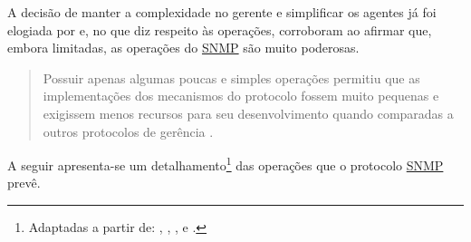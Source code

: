 \documentclass[twoside,english,brazilian]{UNISINOSmonografia}
\begin{document}
A decisão de manter a complexidade no gerente e simplificar os agentes já foi 
elogiada por  e, no que diz respeito às operações, 
 corroboram ao afirmar que, embora 
limitadas, as operações do \hyperref[siglas]{SNMP} são muito poderosas.

\begin{quote}
Possuir apenas algumas poucas e simples operações permitiu que as 
implementações dos mecanismos do protocolo fossem muito pequenas e exigissem 
menos recursos para seu desenvolvimento quando comparadas a outros protocolos 
de gerência
\cite[p.~185]{perkins1997understanding}.
\end{quote}

A seguir apresenta-se um detalhamento\footnote{
	Adaptadas a partir de:
	,
	,
	,
	 e 
	.
} das operações que o protocolo \hyperref[siglas]{SNMP} prevê. 
\end{document}
